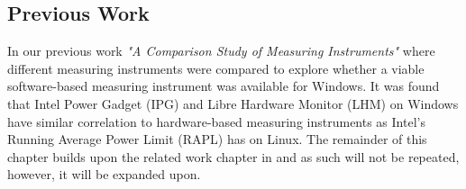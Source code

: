 \subsection{Previous Work}
In our previous work \textit{"A Comparison Study of Measuring Instruments"}\cite{biksbois} where different measuring instruments were compared to explore whether a viable software-based measuring instrument was available for Windows. It was found that Intel Power Gadget (IPG) and Libre Hardware Monitor (LHM) on Windows have similar correlation to hardware-based measuring instruments as Intel's Running Average Power Limit (RAPL) has on Linux. The remainder of this chapter builds upon the related work chapter in \cite{biksbois} and as such will not be repeated, however, it will be expanded upon.

